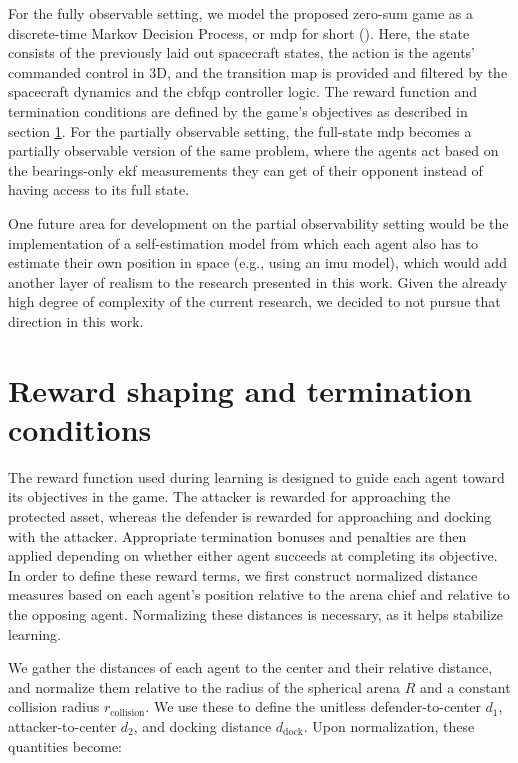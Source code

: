 For the fully observable setting, we model the proposed zero-sum game as a discrete-time Markov Decision Process, or \acs{mdp} for short (\cite{Howard1960DynamicProgramming}). Here, the state consists of the previously laid out spacecraft states, the action is the agents' commanded control in 3D, and the transition map is provided and filtered by the spacecraft dynamics and the \acs{cbfqp} controller logic. The reward function and termination conditions are defined by the game's objectives as described in section \ref{sec:Rewards/Termination}. For the partially observable setting, the full-state \acs{mdp} becomes a partially observable version of the same problem, where the agents act based on the bearings-only \acs{ekf} measurements they can get of their opponent instead of having access to its full state.

One future area for development on the partial observability setting would be the implementation of a self-estimation model from which each agent also has to estimate their own position in space (e.g., using an \acs{imu} model), which would add another layer of realism to the research presented in this work. Given the already high degree of complexity of the current research, we decided to not pursue that direction in this work.


\section{Reward shaping and termination conditions}
\label{sec:Rewards/Termination}

The reward function used during learning is designed to guide each agent toward its objectives in the game. The attacker is rewarded for approaching the protected asset, whereas the defender is rewarded for approaching and docking with the attacker. Appropriate termination bonuses and penalties are then applied depending on whether either agent succeeds at completing its objective. In order to define these reward terms, we first construct normalized distance measures based on each agent's position relative to the arena chief and relative to the opposing agent. Normalizing these distances is necessary, as it helps stabilize learning.

We gather the distances of each agent to the center and their relative distance, and normalize them relative to the radius of the spherical arena \(R\) and a constant collision radius \(r_{\text{collision}}\). We use these to define the unitless defender-to-center \(d_1\), attacker-to-center \(d_2\), and docking distance \(d_{\text{dock}}\). Upon normalization, these quantities become:


